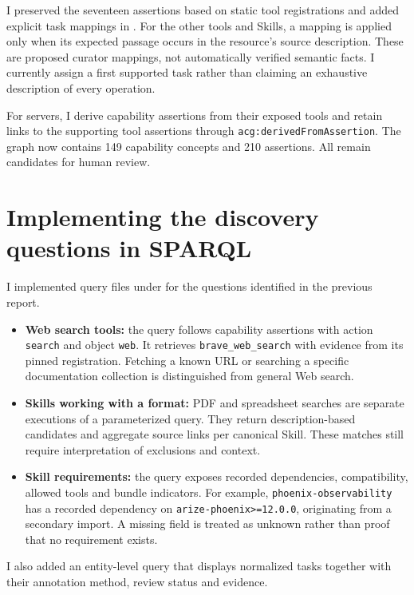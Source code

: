 \documentclass[11pt,a4paper]{article}
\begin{document}
I preserved the seventeen assertions based on static tool registrations and added explicit task mappings in . For the other tools and Skills, a mapping is applied only when its expected passage occurs in the resource's source description. These are proposed curator mappings, not automatically verified semantic facts. I currently assign a first supported task rather than claiming an exhaustive description of every operation.

For servers, I derive capability assertions from their exposed tools and retain links to the supporting tool assertions through \texttt{acg:derivedFromAssertion}. The graph now contains 149 capability concepts and 210 assertions. All remain candidates for human review.

\section{Implementing the discovery questions in SPARQL}

I implemented query files under  for the questions identified in the previous report.

\begin{itemize}
\item \textbf{Web search tools:} the query follows capability assertions with action \texttt{search} and object \texttt{web}. It retrieves \texttt{brave\_web\_search} with evidence from its pinned registration. Fetching a known URL or searching a specific documentation collection is distinguished from general Web search.
\item \textbf{Skills working with a format:} PDF and spreadsheet searches are separate executions of a parameterized query. They return description-based candidates and aggregate source links per canonical Skill. These matches still require interpretation of exclusions and context.
\item \textbf{Skill requirements:} the query exposes recorded dependencies, compatibility, allowed tools and bundle indicators. For example, \texttt{phoenix-observability} has a recorded dependency on \texttt{arize-phoenix>=12.0.0}, originating from a secondary import. A missing field is treated as unknown rather than proof that no requirement exists.
\end{itemize}

I also added an entity-level query that displays normalized tasks together with their annotation method, review status and evidence.
\end{document}
